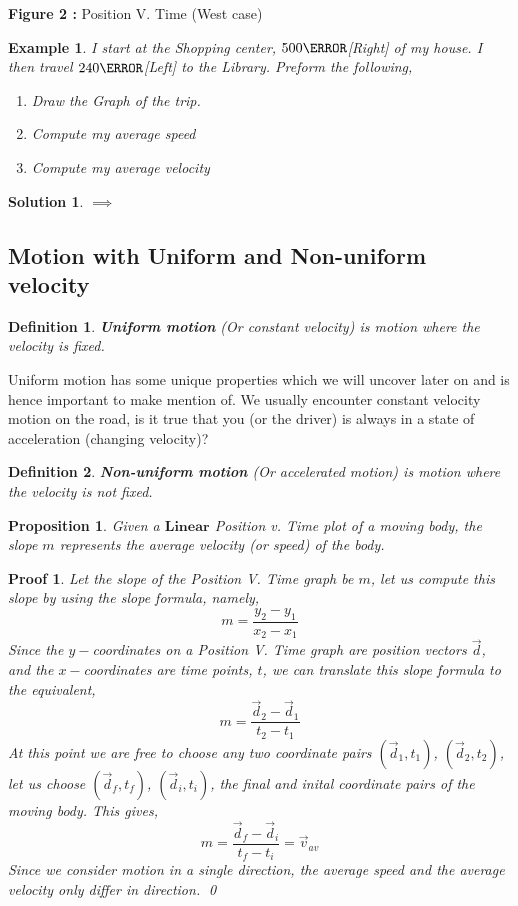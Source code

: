 \documentclass[12pt]{article}
\theoremstyle{break}
\newtheorem{ex}[thm]{Example}
\newtheorem*{pf}{Proof}
\newtheorem*{soln}{Solution}
\newtheorem{defn}{Definition}[subsection]
\newtheorem{prop}[thm]{Proposition}
\begin{document}
\begin{center}
\textbf{Figure 2 :} Position V. Time (West case)
\end{center}

\begin{ex}
I start at the Shopping center, $500\m$[Right] of my house. I then travel $240\m$[Left] to the Library. Preform the following,
\begin{enumerate}[label=(\alph*)]
	\item Draw the Graph of the trip.
	\item Compute my average speed
	\item Compute my average velocity
\end{enumerate}
\end{ex}
\begin{soln}
	$\implies$
	\vspace*{5cm}
\end{soln}
\newpage

\newpage
\vspace*{8cm}

\subsection{Motion with Uniform and Non-uniform velocity}
\begin{defn}
	\textbf{Uniform motion} (Or constant velocity) is motion where the velocity is fixed.
\end{defn}
Uniform motion has some unique properties which we will uncover later on and is hence important to make mention of. We usually encounter constant velocity motion on the road, is it true that you (or the driver) is always in a state of acceleration (changing velocity)?
\begin{defn}
	\textbf{Non-uniform motion} (Or accelerated motion) is motion where the velocity is \emph{not} fixed.
\end{defn}

\begin{prop}
Given a $\textbf{Linear}$ Position v. Time plot of a moving body, the slope $m$ represents the average velocity (or speed) of the body.
\end{prop}
\begin{pf}
Let the slope of the Position V. Time graph be $m$, let us compute this slope by using the slope formula, namely,
$$m = \frac{y_2 - y_1}{x_2 - x_1}$$
Since the $y-$coordinates on a Position V. Time graph are position vectors $\vec d$, and the $x-$coordinates are time points, $t$, we can translate this slope formula to the equivalent,
$$m = \frac{\vec d_2 - \vec d_1}{t_2 - t_1}$$
At this point we are free to choose any two coordinate pairs $(\vec d_1,t_1)$, $(\vec d_2, t_2)$, let us choose $(\vec d_f, t_f)$, $(\vec d_i, t_i)$, the final and inital coordinate pairs of the moving body. This gives,
$$m = \frac{\vec d_f - \vec d_i}{t_f - t_i} = \vec v_{av}$$
Since we consider motion in a single direction, the average speed and the average velocity only differ in direction. \qed
\end{pf}
\end{document}
